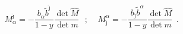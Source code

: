 \begin{equation}
  \label{eq:50}
  M_{\alpha}^{{\hat \jmath}} = - \frac{b_\alpha \tilde{b}^{{\hat \jmath}}}{1-y}
  \frac{\det \hat{M}}{\det m}
~~~;~~~~~
M_{\hat \jmath}^{{\alpha}} = - \frac{b_{\hat \jmath} \tilde{b}^{{\alpha}}}{1-y}
  \frac{\det \hat{M}}{\det m}
~~.
\end{equation}

